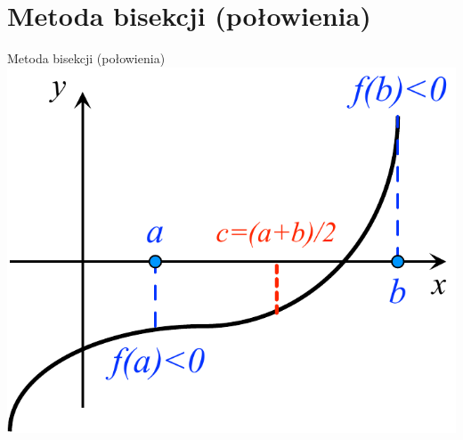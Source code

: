 \section{Metoda bisekcji (połowienia)}
\begin{frame}{Metoda bisekcji (połowienia)}
	\centering \includegraphics[width=.8\linewidth]{img/7/biplot.pdf}
\end{frame}
